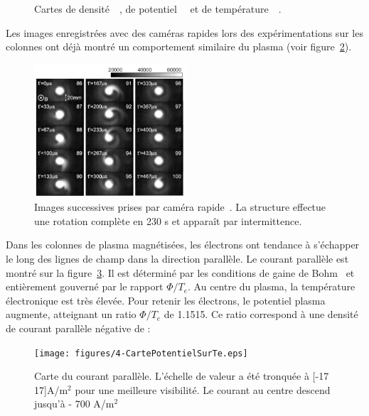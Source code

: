 \begin{refsection}
\begin{figure}[!htbp]
    \caption{Cartes de densité~~, de
    potentiel~~ et de
    température~~.}
    \label{CybeleCartesBase}
\end{figure}

Les images enregistrées avec des caméras rapides lors des expérimentations
sur les colonnes ont déjà montré un
comportement similaire du plasma (voir figure~\ref{4-CybeleNagdis}). 

\begin{figure}[!htbp]
\centering
\includegraphics[width=0.5\textwidth]{figures/4-CybeleNAGDIS.png}
\caption{Images successives prises par caméra rapide~\parencite{NagdisCamera}.
La structure effectue une rotation complète en 230 \micro s et apparaît par
intermittence.
\label{4-CybeleNagdis}}
\end{figure}

Dans les colonnes de plasma magnétisées, les électrons ont tendance à s'échapper
le long des lignes de champ dans la direction parallèle. Le courant parallèle
est montré sur la figure~\ref{4-cybeleCartePotentielSurTe}. Il est
déterminé par les conditions de gaine de Bohm~\parencite{Stangeby} et
entièrement gouverné par le rapport $\Phi/T_e$. Au centre du plasma, la
température électronique est très élevée. Pour retenir les électrons, le
potentiel plasma augmente, atteignant un ratio $\Phi/T_e$ de 1.1515. Ce ratio
correspond à une densité de courant parallèle négative de :

\begin{figure}[!htbp]
  \centering
    \texttt{[image: figures/4-CartePotentielSurTe.eps]}
    \caption{Carte du courant parallèle.
    L'échelle de valeur a été tronquée à
    [-17 17]A/m$^2$ pour une meilleure
    visibilité. Le courant au centre descend jusqu'à
    - 700 A/m$^2$\label{4-cybeleCartePotentielSurTe}}
\end{figure}


\end{refsection}
